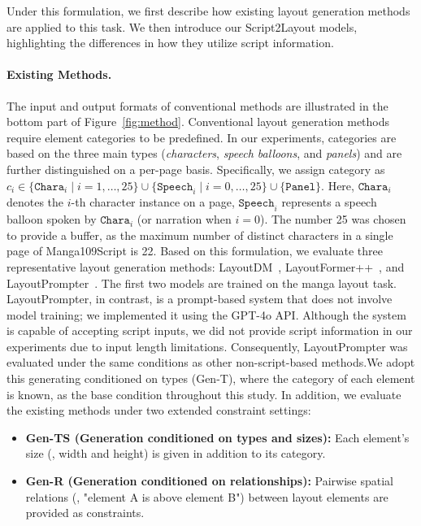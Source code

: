 Under this formulation, we first describe how existing layout generation methods are applied to this task. We then introduce our Script2Layout models, highlighting the differences in how they utilize script information.

\vspace{-0.8em}
\paragraph{Existing Methods.}
The input and output formats of conventional methods are illustrated in the bottom part of Figure~\ref{fig:method}. Conventional layout generation methods require element categories to be predefined. In our experiments, categories are based on the three main types (\textit{characters}, \textit{speech balloons}, and \textit{panels}) and are further distinguished on a per-page basis. Specifically, we assign category as $c_i \in \{\texttt{Chara}_i \mid i=1,\dots,25\} \cup \{\texttt{Speech}_i \mid i=0,\dots,25\} \cup \{\texttt{Panel}\}$. Here, $\texttt{Chara}_i$ denotes the $i$-th character instance on a page, $\texttt{Speech}_i$ represents a speech balloon spoken by $\texttt{Chara}_i$ (or narration when $i = 0$). The number 25 was chosen to provide a buffer, as the maximum number of distinct characters in a single page of Manga109Script is 22. Based on this formulation, we evaluate three representative layout generation methods: LayoutDM~\cite{inoue2023layoutdm}, LayoutFormer++~\cite{jiang_layoutformer_2023}, and LayoutPrompter~\cite{lin_layoutprompter_2023}. The first two models are trained on the manga layout task. LayoutPrompter, in contrast, is a prompt-based system that does not involve model training; we implemented it using the GPT-4o API. Although the system is capable of accepting script inputs, we did not provide script information in our experiments due to input length limitations. Consequently, LayoutPrompter was evaluated under the same conditions as other non-script-based methods.We adopt this generating conditioned on types (Gen-T), where the category of each element is known, as the base condition throughout this study. In addition, we evaluate the existing methods under two extended constraint settings: 

\begin{itemize}
  \item \textbf{Gen-TS (Generation conditioned on types and sizes):} Each element's size (\ie, width and height) is given in addition to its category.
  \item \textbf{Gen-R (Generation conditioned on relationships):} Pairwise spatial relations (\eg, "element A is above element B") between layout elements are provided as constraints.
\end{itemize}

